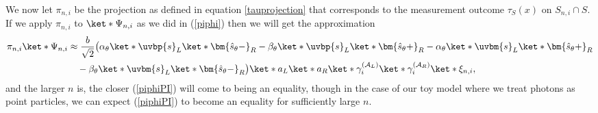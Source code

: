 \documentclass[12pt]{report}
\begin{document}
We now let $\pi_{n,i}$ be the projection as defined in equation \ref{tauprojection} that corresponds to the measurement outcome $\tau_S(x)$ on $S_{n,i}\cap S$. If we apply $\pi_{n,i}$ to $\ket*{\Psi_{n,i}}$ as we did in (\ref{piphi}) then we will get the approximation
\begin{equation}\label{piphiPI}
	\begin{split}
		\pi_{n,i}\ket*{\Psi_{n,i}}&\approx\frac{b}{\sqrt{2}}\big(\alpha_\theta\ket*{\uvbp{s}}_L\ket*{\bm{\hat{s}_\theta-}}_R
		-\beta_\theta\ket*{\uvbp{s}}_L\ket*{\bm{\hat{s}_\theta+}}_R-\alpha_\theta\ket*{\uvbm{s}}_L\ket*{\bm{\hat{s}_\theta+}}_R\\
		&\quad
		-\beta_\theta\ket*{\uvbm{s}}_L\ket*{\bm{\hat{s}_\theta-}}_R\big)\ket*{a}_L\ket*{a}_R\ket*{\gamma_i^{(\mathcal{A}_L)}}\ket*{\gamma_i^{(\mathcal{A}_R)}}\ket*{\xi_{n,i}},
		\end{split}
\end{equation}
and the larger $n$ is, the closer (\ref{piphiPI}) will come to being an equality, though in the case of our toy model where we treat photons as point particles, we can expect (\ref{piphiPI}) to become an equality for sufficiently large $n$.
\end{document}
